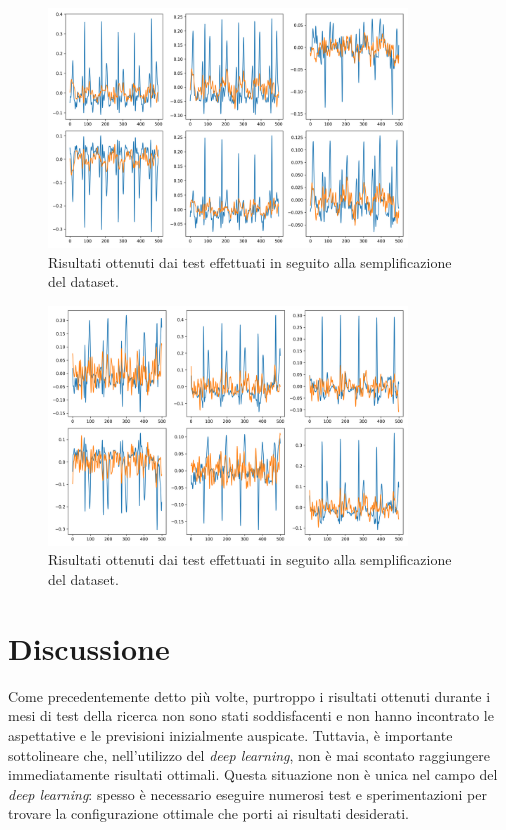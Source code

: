 \begin{figure}[H]
    \centering
    \includegraphics[width=0.85\textwidth]{immagini/seconda_cnn_risultati_secondo_plot_0.png}
    \captionsetup{justification=centering}
    \caption{Risultati ottenuti dai test effettuati in seguito alla semplificazione del dataset.}
    \label{fig:seconda_cnn_risultati_secondo_plot_0}
\end{figure}
\begin{figure}[H]
    \centering
    \includegraphics[width=0.85\textwidth]{immagini/seconda_cnn_risultati_secondo_plot_1.png}
    \captionsetup{justification=centering}
    \caption{Risultati ottenuti dai test effettuati in seguito alla semplificazione del dataset.}
    \label{fig:seconda_cnn_risultati_secondo_plot_1}
\end{figure}

\section{Discussione}
\label{sec:discussione}

Come precedentemente detto più volte, purtroppo i risultati ottenuti durante i mesi di test della ricerca non sono stati soddisfacenti e non hanno incontrato le aspettative e le previsioni inizialmente auspicate. Tuttavia, è importante sottolineare che, nell'utilizzo del \textit{deep learning}, non è mai scontato raggiungere immediatamente risultati ottimali. Questa situazione non è unica nel campo del \textit{deep learning}: spesso è necessario eseguire numerosi test e sperimentazioni per trovare la configurazione ottimale che porti ai risultati desiderati.

